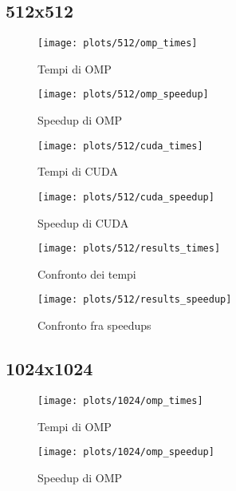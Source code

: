 \subsection{512x512}\label{subsec:512x512}
\begin{figure}[H]
    \centering
    \begin{minipage}{0.49\textwidth}
        \centering
        \texttt{[image: plots/512/omp\_times]}
        \caption{Tempi di OMP}\label{fig:times-512-omp}
    \end{minipage}
    \begin{minipage}{0.49\textwidth}
        \centering
        \texttt{[image: plots/512/omp\_speedup]}
        \caption{Speedup di OMP}\label{fig:speedup-512-omp}
    \end{minipage}
\end{figure}

\begin{figure}[H]
    \centering
    \begin{minipage}{0.49\textwidth}
        \centering
        \texttt{[image: plots/512/cuda\_times]}
        \caption{Tempi di CUDA}\label{fig:times-512-cuda}
    \end{minipage}
    \begin{minipage}{0.49\textwidth}
        \centering
        \texttt{[image: plots/512/cuda\_speedup]}
        \caption{Speedup di CUDA}\label{fig:speedup-512-cuda}
    \end{minipage}
\end{figure}

\begin{figure}[H]
    \centering
    \begin{minipage}{0.49\textwidth}
        \centering
        \texttt{[image: plots/512/results\_times]}
        \caption{Confronto dei tempi}\label{fig:tempi-512}
    \end{minipage}
    \begin{minipage}{0.49\textwidth}
        \centering
        \texttt{[image: plots/512/results\_speedup]}
        \caption{Confronto fra speedups}\label{fig:speedups-512}
    \end{minipage}
\end{figure}

\subsection{1024x1024}\label{subsec:1024x1024}
\begin{figure}[H]
    \centering
    \begin{minipage}{0.49\textwidth}
        \centering
        \texttt{[image: plots/1024/omp\_times]}
        \caption{Tempi di OMP}\label{fig:times-1024-omp}
    \end{minipage}
    \begin{minipage}{0.49\textwidth}
        \centering
        \texttt{[image: plots/1024/omp\_speedup]}
        \caption{Speedup di OMP}\label{fig:speedup-1024-omp}
    \end{minipage}
\end{figure}

